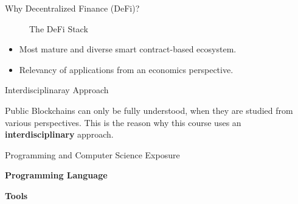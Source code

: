 \documentclass[]{beamer}
\begin{document}
\begin{frame}{Why Decentralized Finance (DeFi)?}

\begin{figure}[t]
	\centering	
	\resizebox{0.8\textwidth}{!}{
	\begin{tikzpicture}[scale=1.0, every node/.style={scale=1.0}]
			
	\end{tikzpicture}}
	\caption{The DeFi Stack \cite{FS:21}}
\end{figure}

\vspace{-1.0em}

\begin{itemize}
	\item Most mature and diverse smart contract-based ecosystem.
	\item Relevancy of applications from an economics perspective.
\end{itemize}

\end{frame}

\begin{frame}{Interdisciplinaray Approach}

	\vspace{1em}
Public Blockchains can only be fully understood, when they are studied from various perspectives. This is the reason why this course uses an \color{focus} \textbf{interdisciplinary} \color{black} approach.	


\end{frame}

\begin{frame}{Programming and Computer Science Exposure}

\textbf{Programming Language}
\vspace{1em}

\begin{minipage}{0.16\textwidth}
	\begin{figure}[t]
		\begin{tikzpicture}[scale=1.0, every node/.style={scale=1.0}]
				
		\end{tikzpicture}
	\end{figure}
\end{minipage}
\vspace{2em}

\textbf{Tools}
\vspace{1em}

\begin{minipage}{0.95\textwidth}
	\begin{figure}[t]	
		\begin{tikzpicture}[scale=1.0, every node/.style={scale=1.0}]
				
		\end{tikzpicture}
	\end{figure}
\end{minipage}



\end{frame}
\end{document}
